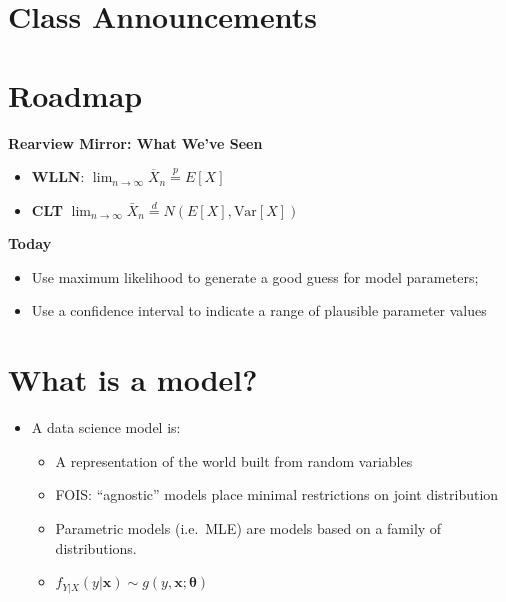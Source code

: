 \documentclass[
]{book}
\providecommand{\tightlist}{%
  \setlength{\itemsep}{0pt}\setlength{\parskip}{0pt}}
\theoremstyle{definition}
\theoremstyle{definition}
\theoremstyle{definition}
\theoremstyle{definition}
\theoremstyle{remark}
\begin{document}
\hypertarget{class-announcements-12}{%
\section{Class Announcements}\label{class-announcements-12}}

\hypertarget{roadmap-10}{%
\section{Roadmap}\label{roadmap-10}}

\textbf{Rearview Mirror: What We've Seen}

\begin{itemize}
\tightlist
\item
  \textbf{WLLN}: \(\displaystyle\lim_{n \to \infty} \overline{X}_n \overset{p}{=} E[X]\)
\item
  \textbf{CLT} \(\displaystyle\lim_{n \to \infty} \bar{X}_n \overset{d}{=} N(E[X], \text{Var}[X])\)
\end{itemize}

\textbf{Today}

\begin{itemize}
\tightlist
\item
  Use maximum likelihood to generate a good guess for model parameters;
\item
  Use a confidence interval to indicate a range of plausible parameter values
\end{itemize}

\hypertarget{what-is-a-model}{%
\section{What is a model?}\label{what-is-a-model}}

\begin{itemize}
\tightlist
\item
  A data science model is:

  \begin{itemize}
  \tightlist
  \item
    A representation of the world built from random variables
  \item
    FOIS: ``agnostic'' models place minimal restrictions on joint distribution
  \item
    Parametric models (i.e.~MLE) are models based on a family of distributions.
  \item
    \(f_{Y|X}(y|\mathbf{x}) \sim g(y, \mathbf{x}; \mathbf{\theta})\)
  \end{itemize}
\end{itemize}
\end{document}

